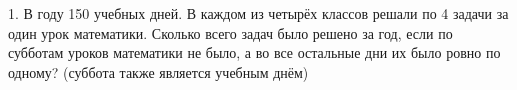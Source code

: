 1. В году 150 учебных дней. В каждом из четырёх классов решали по 4 задачи за один урок математики. Сколько всего задач было решено за год, если по субботам уроков математики не было, а во все остальные дни их было ровно по одному? (суббота также является учебным днём)\\
